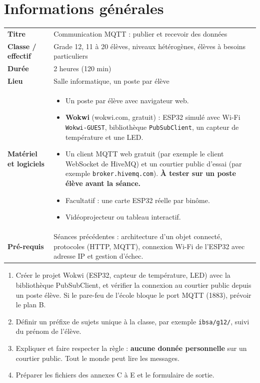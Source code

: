 \documentclass[11pt,a4paper]{article}
\begin{document}

\section{Informations générales}
\begin{tabularx}{\linewidth}{>{\bfseries}p{3.6cm}Y}
\toprule
Titre & Communication MQTT : publier et recevoir des données\\
Classe / effectif & Grade 12, 11 à 20 élèves, niveaux hétérogènes, élèves à besoins particuliers\\
Durée & 2 heures (120 min)\\
Lieu & Salle informatique, un poste par élève\\
Matériel et logiciels &
\begin{itemize}
 \item Un poste par élève avec navigateur web.
 \item \textbf{Wokwi} (wokwi.com, gratuit) : ESP32 simulé avec Wi-Fi \texttt{Wokwi-GUEST}, bibliothèque \texttt{PubSubClient}, un capteur de température et une LED.
 \item Un client MQTT web gratuit (par exemple le client WebSocket de HiveMQ) et un courtier public d'essai (par exemple \texttt{broker.hivemq.com}). \textbf{À tester sur un poste élève avant la séance.}
 \item Facultatif : une carte ESP32 réelle par binôme.
 \item Vidéoprojecteur ou tableau interactif.
\end{itemize}\\
Pré-requis &
Séances précédentes : architecture d'un objet connecté, protocoles (HTTP, MQTT), connexion Wi-Fi de l'ESP32 avec adresse IP et gestion d'échec.\\
\bottomrule
\end{tabularx}

\begin{astuce}
\begin{enumerate}
 \item Créer le projet Wokwi (ESP32, capteur de température, LED) avec la bibliothèque PubSubClient, et vérifier la connexion au courtier public depuis un poste élève. Si le pare-feu de l'école bloque le port MQTT (1883), prévoir le plan B.
 \item Définir un préfixe de sujets unique à la classe, par exemple \texttt{ibsa/g12/}, suivi du prénom de l'élève.
 \item Expliquer et faire respecter la règle : \textbf{aucune donnée personnelle} sur un courtier public. Tout le monde peut lire les messages.
 \item Préparer les fichiers des annexes C à E et le formulaire de sortie.
\end{enumerate}
\end{astuce}
\end{document}
